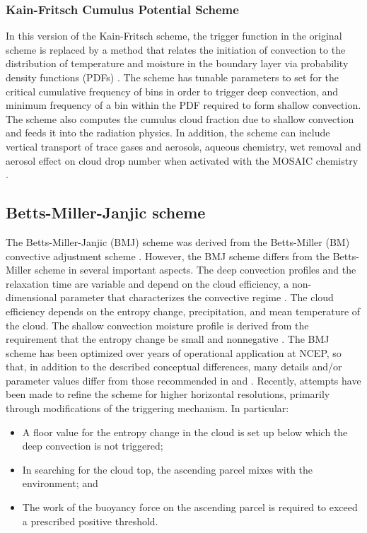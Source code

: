 \subsubsection{Kain-Fritsch Cumulus Potential Scheme}

In this version of the Kain-Fritsch scheme, the trigger function in the original scheme 
is replaced by a method that relates the initiation of convection to the distribution of 
temperature and moisture in the boundary layer via probability density functions (PDFs)
\citep{berg13}. The scheme has tunable 
parameters to set for the critical cumulative frequency of bins in order to trigger deep 
convection, and minimum frequency of a bin within the PDF required to form shallow convection. 
The scheme also computes the cumulus cloud fraction due to shallow convection and feeds it into 
the radiation physics. In addition, the scheme can include vertical transport of trace gases and 
aerosols, aqueous chemistry, wet removal and aerosol effect on cloud drop number when 
activated with the MOSAIC chemistry \citep{berg15}.


\subsection{Betts-Miller-Janjic scheme}

The Betts-Miller-Janjic (BMJ) scheme  \citep{janjic94,janjic00} 
was derived from the Betts-Miller (BM) convective adjustment scheme 
\citep{betts86,bettsmiller86}.  However, the BMJ scheme differs 
from the Betts-Miller scheme in several important aspects. The deep convection 
profiles and the relaxation time are variable and depend on the cloud 
efficiency, a non-dimensional parameter that characterizes the convective 
regime \citep{janjic94}. The cloud efficiency depends on the entropy change, 
precipitation, and mean temperature of the cloud. The shallow convection 
moisture profile is derived from the requirement that the entropy change be 
small and nonnegative \citep{janjic94}.  The BMJ scheme has been optimized 
over years of operational application at NCEP,
so that, in addition to the described conceptual 
differences, many details and/or parameter values differ from those 
recommended in \citet{betts86} and \citet{bettsmiller86}.  Recently, attempts 
have been made to refine the scheme for higher horizontal resolutions, 
primarily through modifications of the triggering mechanism.  In particular:
 
\begin{itemize}\setlength{\parskip}{-4pt}
\item
A floor value for the entropy change in the cloud is set up below which the 
deep convection is not triggered;
\item
In searching for the cloud top, the ascending parcel mixes with the environment; and
\item
The work of the buoyancy force on the ascending parcel is required to exceed 
a prescribed positive threshold.
\end{itemize}

